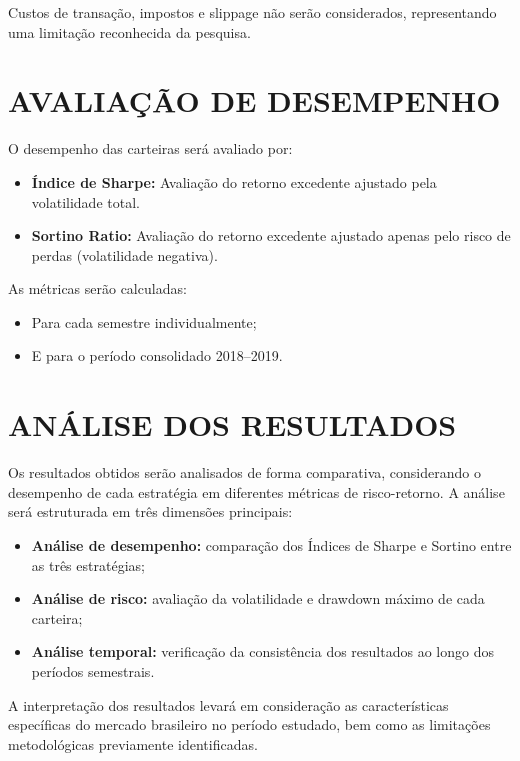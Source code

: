 Custos de transação, impostos e slippage não serão considerados, representando uma limitação reconhecida da pesquisa.

\section{AVALIAÇÃO DE DESEMPENHO}

O desempenho das carteiras será avaliado por:

\begin{itemize}
    \item \textbf{Índice de Sharpe:} Avaliação do retorno excedente ajustado pela volatilidade total.
    \item \textbf{Sortino Ratio:} Avaliação do retorno excedente ajustado apenas pelo risco de perdas (volatilidade negativa).
\end{itemize}

As métricas serão calculadas:
\begin{itemize}
    \item Para cada semestre individualmente;
    \item E para o período consolidado 2018--2019.
\end{itemize}

\section{ANÁLISE DOS RESULTADOS}

Os resultados obtidos serão analisados de forma comparativa, considerando o desempenho de cada estratégia em diferentes métricas de risco-retorno. A análise será estruturada em três dimensões principais:

\begin{itemize}
    \item \textbf{Análise de desempenho:} comparação dos Índices de Sharpe e Sortino entre as três estratégias;
    \item \textbf{Análise de risco:} avaliação da volatilidade e drawdown máximo de cada carteira;
    \item \textbf{Análise temporal:} verificação da consistência dos resultados ao longo dos períodos semestrais.
\end{itemize}

A interpretação dos resultados levará em consideração as características específicas do mercado brasileiro no período estudado, bem como as limitações metodológicas previamente identificadas.


